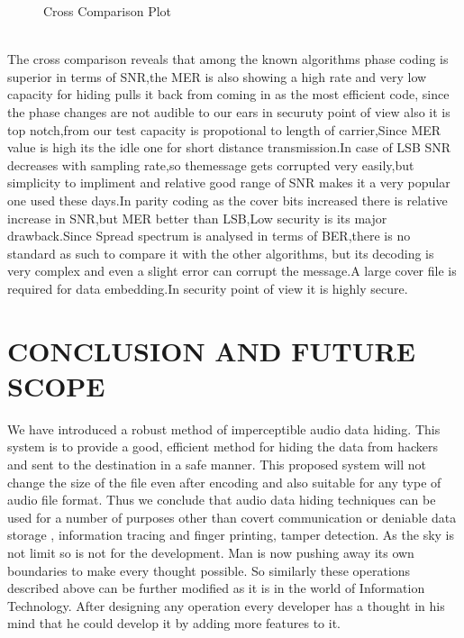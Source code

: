 \documentclass[a4paper, 12pt, notitlepage]{report}
\begin{document}
\begin{figure}[h!]
{\par}
\caption{Cross Comparison Plot}
\end{figure}\\

The cross comparison reveals that among the known algorithms phase coding is superior in terms of SNR,the MER is also showing a high rate and very low capacity for hiding pulls it back from coming in as the most efficient code, since the phase changes are not audible to our ears in securuty point of view also it is top notch,from our test capacity is propotional to length of carrier,Since MER value is high its the idle one for short distance transmission.In case of LSB SNR decreases with sampling rate,so themessage gets corrupted very easily,but simplicity to impliment and relative good range of SNR makes it a very popular one used these days.In parity coding as the cover bits increased there is relative increase in SNR,but MER better than LSB,Low security is its major drawback.Since Spread spectrum is analysed in terms of BER,there is no standard as such to compare it with the other algorithms, but its decoding is very complex and even a slight error can corrupt the message.A large cover file is required for data embedding.In security point of view it is highly secure.

\chapter{CONCLUSION AND FUTURE SCOPE}

 We have introduced a robust method of imperceptible audio data hiding. This system is to provide a good, efficient method for hiding the data from hackers and sent to the destination in a safe manner. This proposed system will not change the size of the file even after encoding and also suitable for any type of audio file format. Thus we conclude that audio data hiding techniques can be used for a number of purposes other than covert communication or deniable data storage , information tracing and finger printing, tamper detection. As the sky is not limit so is not for the development. Man is now pushing away its own boundaries to make every thought possible. So similarly these operations described above can be further modified as it is in the world of Information Technology. After designing any operation every developer has a thought in his mind that he could develop it by 
adding more features to it.\\
\end{document}
